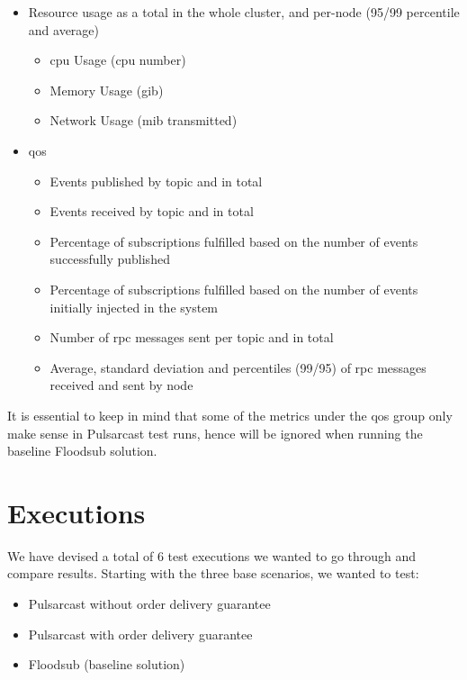 \begin{itemize}
  \item Resource usage as a total in the whole cluster, and per-node (95/99
  percentile and average)
  \begin{itemize}
    \item \acrshort{cpu} Usage (\acrshort{cpu} number)
    \item Memory Usage (\acrshort{gib})
    \item Network Usage (\acrshort{mib} transmitted)
  \end{itemize}
  \item \acrshort{qos}
  \begin{itemize}
    \item Events published by topic and in total
    \item Events received by topic and in total
    \item Percentage of subscriptions fulfilled based on the number of events
    successfully published
    \item Percentage of subscriptions fulfilled based on the number of events
    initially injected in the system
    \item Number of \acrshort{rpc} messages sent per topic and in total
    \item Average, standard deviation and percentiles (99/95) of \acrshort{rpc} messages received and sent by node
  \end{itemize}
\end{itemize}

It is essential to keep in mind that some of the metrics under the \acrshort{qos} group
only make sense in Pulsarcast test runs, hence will be ignored when running the
baseline Floodsub solution.

\section{Executions}\label{executions}

We have devised a total of 6 test executions we wanted to go through and
compare results. Starting with the three base scenarios, we wanted to test:

\begin{itemize}
  \item Pulsarcast without order delivery guarantee
  \item Pulsarcast with order delivery guarantee
  \item Floodsub (baseline solution)
\end{itemize}

